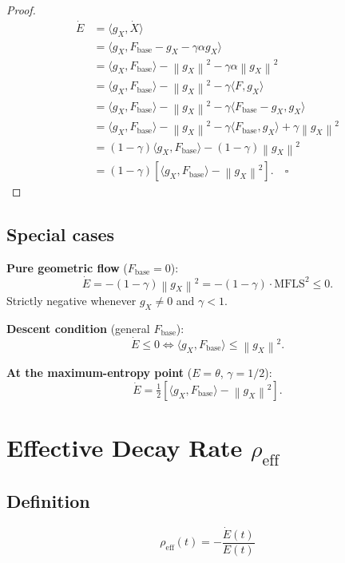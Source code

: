 \documentclass[11pt,a4paper]{article}
\theoremstyle{definition}
\newcommand{\norm}[1]{\left\|#1\right\|}
\newcommand{\Fbase}{F_{\mathrm{base}}}
\newcommand{\gX}{g_X}
\newcommand{\half}{\tfrac{1}{2}}
\newcommand{\mfls}{\mathrm{MFLS}}
\begin{document}
\begin{proof}
\begin{align*}
\dot E &= \langle\gX, \dot X\rangle \\
&= \langle\gX, \Fbase - \gX - \gamma\alpha\gX\rangle \\
&= \langle\gX,\Fbase\rangle - \norm{\gX}^2 - \gamma\alpha\norm{\gX}^2 \\
&= \langle\gX,\Fbase\rangle - \norm{\gX}^2 - \gamma\langle F,\gX\rangle \\
&= \langle\gX,\Fbase\rangle - \norm{\gX}^2 - \gamma\langle\Fbase-\gX,\gX\rangle \\
&= \langle\gX,\Fbase\rangle - \norm{\gX}^2 - \gamma\langle\Fbase,\gX\rangle + \gamma\norm{\gX}^2 \\
&= (1-\gamma)\langle\gX,\Fbase\rangle - (1-\gamma)\norm{\gX}^2 \\
&= (1-\gamma)\left[\langle\gX,\Fbase\rangle - \norm{\gX}^2\right]. \quad\square
\end{align*}
\end{proof}

\subsection{Special cases}

\textbf{Pure geometric flow} ($\Fbase = 0$):
\[
\dot E = -(1-\gamma)\norm{\gX}^2 = -(1-\gamma)\cdot\mfls^2 \leq 0.
\]
Strictly negative whenever $\gX \neq 0$ and $\gamma < 1$.

\textbf{Descent condition} (general $\Fbase$):
\[
\dot E \leq 0 \iff \langle\gX,\Fbase\rangle \leq \norm{\gX}^2.
\]

\textbf{At the maximum-entropy point} ($E = \theta$, $\gamma = 1/2$):
\[
\dot E = \half\left[\langle\gX,\Fbase\rangle - \norm{\gX}^2\right].
\]

\section{Effective Decay Rate $\rho_\mathrm{eff}$}

\subsection{Definition}

\begin{lockedbox}
\[
\rho_\mathrm{eff}(t) = -\frac{\dot E(t)}{E(t)}
\]
\end{lockedbox}
\end{document}
